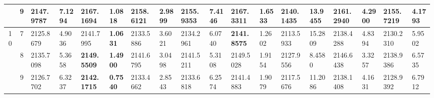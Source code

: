 \documentclass[conference]{IEEEtran}
\begin{document}
\begin{table*}[]
\begin{tabular}{|cc|ll|ll|ll|ll|ll|ll|ll|ll|}
		\multicolumn{1}{|c|}{}                            & 9                               & \multicolumn{1}{l|}{2147.9787}         & 7.1294                            & \multicolumn{1}{l|}{2167.1694}          & \textbf{1.0818}                   & \multicolumn{1}{l|}{2158.6121}         & 2.9899                            & \multicolumn{1}{l|}{2155.9353}         & 7.4146                            & \multicolumn{1}{l|}{\textbf{2167.3311}} & 1.6533                            & \multicolumn{1}{l|}{2140.1435}         & 13.9455                           & \multicolumn{1}{l|}{2161.2940}         & 4.2900                            & \multicolumn{1}{l|}{2155.7219}         & 4.1793                            \\ \hline
		\multicolumn{1}{|c|}{\multirow{3}{*}{10}}         & 7                               & \multicolumn{1}{l|}{2125.8679}         & 4.9036                            & \multicolumn{1}{l|}{2141.7995}          & \textbf{1.0631}                   & \multicolumn{1}{l|}{2133.5886}         & 3.6021                            & \multicolumn{1}{l|}{2134.2961}         & 6.0740                            & \multicolumn{1}{l|}{\textbf{2141.8575}} & 1.2602                            & \multicolumn{1}{l|}{2113.5933}         & 15.2809                           & \multicolumn{1}{l|}{2138.4288}         & 4.8394                            & \multicolumn{1}{l|}{2130.2310}         & 5.9502                            \\ \cline{2-18} 
		\multicolumn{1}{|c|}{}                            & 8                               & \multicolumn{1}{l|}{2135.7098}         & 5.3658                            & \multicolumn{1}{l|}{\textbf{2149.5509}} & \textbf{1.4900}                   & \multicolumn{1}{l|}{2141.6795}         & 3.0498                            & \multicolumn{1}{l|}{2141.5211}         & 5.3108                            & \multicolumn{1}{l|}{2149.5028}          & 1.9154                            & \multicolumn{1}{l|}{2127.9556}         & 8.4580                            & \multicolumn{1}{l|}{2146.6438}         & 3.3257                            & \multicolumn{1}{l|}{2138.9386}         & 6.5735                            \\ \cline{2-18} 
		\multicolumn{1}{|c|}{}                            & 9                               & \multicolumn{1}{l|}{2126.7702}         & 6.3237                            & \multicolumn{1}{l|}{\textbf{2142.1715}} & \textbf{0.7540}                   & \multicolumn{1}{l|}{2133.4662}         & 2.8543                            & \multicolumn{1}{l|}{2133.6818}         & 6.2574                            & \multicolumn{1}{l|}{2141.4883}          & 1.9079                            & \multicolumn{1}{l|}{2117.5676}         & 11.2086                           & \multicolumn{1}{l|}{2138.1408}         & 4.1631                            & \multicolumn{1}{l|}{2128.9392}         & 6.7912                            \\ \hline

\end{tabular}
\end{table*}
\end{document}
